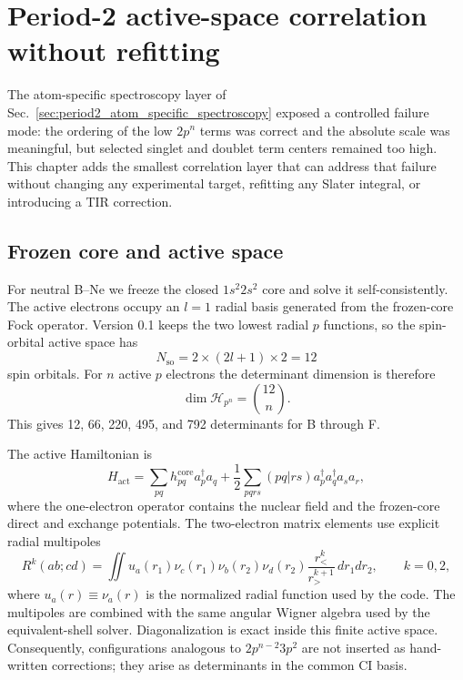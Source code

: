 \section{Period-2 active-space correlation without refitting}
\label{sec:period2-active-ci}

The atom-specific spectroscopy layer of Sec.~\ref{sec:period2_atom_specific_spectroscopy} exposed a controlled failure mode: the ordering of the low $2p^n$ terms was correct and the absolute scale was meaningful, but selected singlet and doublet term centers remained too high.  This chapter adds the smallest correlation layer that can address that failure without changing any experimental target, refitting any Slater integral, or introducing a TIR correction.

\subsection{Frozen core and active space}
For neutral B--Ne we freeze the closed $1s^2 2s^2$ core and solve it self-consistently.  The active electrons occupy an $l=1$ radial basis generated from the frozen-core Fock operator.  Version 0.1 keeps the two lowest radial $p$ functions, so the spin-orbital active space has
\begin{equation}
N_{\mathrm{so}}=2\times(2l+1)\times 2=12
\end{equation}
spin orbitals.  For $n$ active $p$ electrons the determinant dimension is therefore
\begin{equation}
\dim\mathcal H_{p^n}=\binom{12}{n}.
\end{equation}
This gives 12, 66, 220, 495, and 792 determinants for B through F.

The active Hamiltonian is
\begin{equation}
H_{\mathrm{act}}
=\sum_{pq}h^{\mathrm{core}}_{pq}a_p^\dagger a_q
+\frac12\sum_{pqrs}(pq|rs)a_p^\dagger a_q^\dagger a_s a_r,
\end{equation}
where the one-electron operator contains the nuclear field and the frozen-core direct and exchange potentials.  The two-electron matrix elements use explicit radial multipoles
\begin{equation}
R^k(ab;cd)=\iint
u_a(r_1)\nu_c(r_1)\nu_b(r_2)\nu_d(r_2)
\frac{r_<^k}{r_>^{k+1}}\,dr_1dr_2,
\qquad k=0,2,
\end{equation}
where $u_a(r)\equiv \nu_a(r)$ is the normalized radial function used by the code.
The multipoles are combined with the same angular Wigner algebra used by the equivalent-shell solver.  Diagonalization is exact inside this finite active space.  Consequently, configurations analogous to $2p^{n-2}3p^2$ are not inserted as hand-written corrections; they arise as determinants in the common CI basis.

